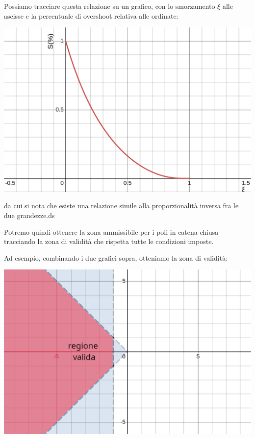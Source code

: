 \documentclass[a4paper,11pt]{article}
\begin{document}
\begin{itemize}
		Possiamo tracciare questa relazione su un grafico, con lo smorzamento $\xi$ alle ascisse e la percentuale di overshoot relativa alle ordinate:
		\begin{center}
			\includegraphics[scale=0.28]{../figures/damping_overshoot.png}
		\end{center}
		da cui si nota che esiste una relazione simile alla proporzionalità inversa fra le due grandezze.ds
\end{itemize}

Potremo quindi ottenere la zona ammissibile per i poli in catena chiusa tracciando la zona di validità che rispetta tutte le condizioni imposte.

\noindent
\begin{minipage}{\textwidth}

Ad esempio, combinando i due grafici sopra, otteniamo la zona di validità:

\begin{center}
	\includegraphics[scale=0.28]{../figures/valid_rlocus_region.png}
\end{center}

\end{minipage}
\end{document}

